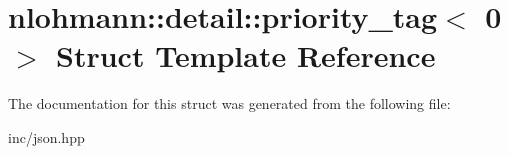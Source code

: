 \hypertarget{structnlohmann_1_1detail_1_1priority__tag_3_010_01_4}{}\section{nlohmann\+:\+:detail\+:\+:priority\+\_\+tag$<$ 0 $>$ Struct Template Reference}
\label{structnlohmann_1_1detail_1_1priority__tag_3_010_01_4}


The documentation for this struct was generated from the following file\+:\begin{DoxyCompactItemize}
\item 
inc/json.\+hpp\end{DoxyCompactItemize}
